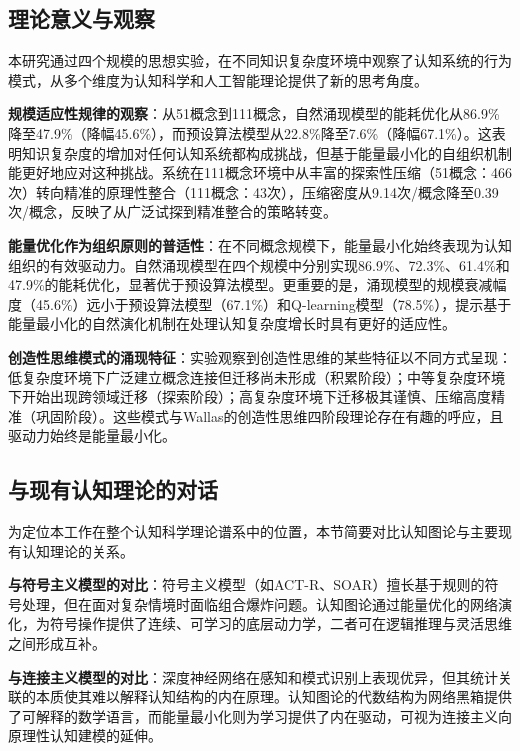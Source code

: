 \documentclass[12pt,a4paper]{article}
\begin{document}
\subsection{理论意义与观察}

本研究通过四个规模的思想实验，在不同知识复杂度环境中观察了认知系统的行为模式，从多个维度为认知科学和人工智能理论提供了新的思考角度。

\textbf{规模适应性规律的观察}：从51概念到111概念，自然涌现模型的能耗优化从86.9\%降至47.9\%（降幅45.6\%），而预设算法模型从22.8\%降至7.6\%（降幅67.1\%）。这表明知识复杂度的增加对任何认知系统都构成挑战，但基于能量最小化的自组织机制能更好地应对这种挑战。系统在111概念环境中从丰富的探索性压缩（51概念：466次）转向精准的原理性整合（111概念：43次），压缩密度从9.14次/概念降至0.39次/概念，反映了从广泛试探到精准整合的策略转变。

\textbf{能量优化作为组织原则的普适性}：在不同概念规模下，能量最小化始终表现为认知组织的有效驱动力。自然涌现模型在四个规模中分别实现86.9\%、72.3\%、61.4\%和47.9\%的能耗优化，显著优于预设算法模型。更重要的是，涌现模型的规模衰减幅度（45.6\%）远小于预设算法模型（67.1\%）和Q-learning模型（78.5\%），提示基于能量最小化的自然演化机制在处理认知复杂度增长时具有更好的适应性。

\textbf{创造性思维模式的涌现特征}：实验观察到创造性思维的某些特征以不同方式呈现：低复杂度环境下广泛建立概念连接但迁移尚未形成（积累阶段）；中等复杂度环境下开始出现跨领域迁移（探索阶段）；高复杂度环境下迁移极其谨慎、压缩高度精准（巩固阶段）。这些模式与Wallas的创造性思维四阶段理论存在有趣的呼应，且驱动力始终是能量最小化。

\subsection{与现有认知理论的对话}

为定位本工作在整个认知科学理论谱系中的位置，本节简要对比认知图论与主要现有认知理论的关系。

\textbf{与符号主义模型的对比}：符号主义模型（如ACT-R、SOAR）擅长基于规则的符号处理，但在面对复杂情境时面临组合爆炸问题。认知图论通过能量优化的网络演化，为符号操作提供了连续、可学习的底层动力学，二者可在逻辑推理与灵活思维之间形成互补。

\textbf{与连接主义模型的对比}：深度神经网络在感知和模式识别上表现优异，但其统计关联的本质使其难以解释认知结构的内在原理。认知图论的代数结构为网络黑箱提供了可解释的数学语言，而能量最小化则为学习提供了内在驱动，可视为连接主义向原理性认知建模的延伸。
\end{document}
